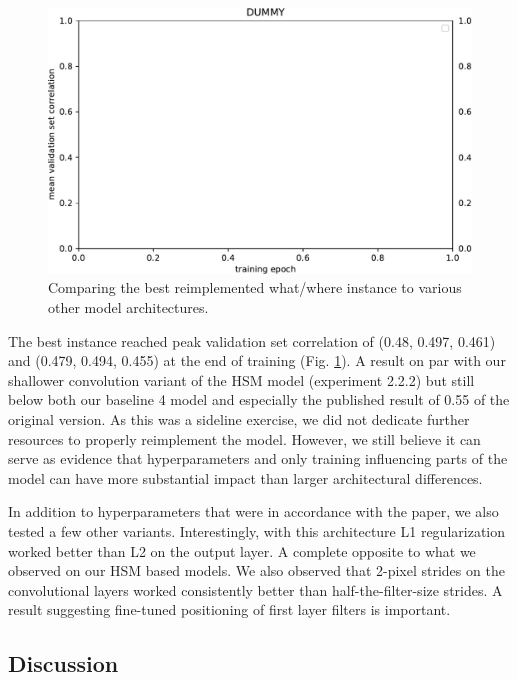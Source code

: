 \begin{figure}[H]
    \centering
    \includegraphics[width=1\textwidth]{../figures/05_dummy}
    \caption[Experiment 5.2.2.5]{Comparing the best reimplemented what/where instance to various other model architectures.}
    \label{fig:5.2.2.5}
\end{figure}

The best instance reached peak validation set correlation of (0.48, 0.497, 0.461) and (0.479, 0.494, 0.455) at the end of training (Fig. \ref{fig:5.2.2.5}). A result on par with our shallower convolution variant of the HSM model (experiment 2.2.2) but still below both our baseline 4 model and especially the published result of 0.55 of the original \citeauthor{klidnt} version. As this was a sideline exercise, we did not dedicate further resources to properly reimplement the model. However, we still believe it can serve as evidence that hyperparameters and only training influencing parts of the model can have more substantial impact than larger architectural differences.

In addition to hyperparameters that were in accordance with the paper, we also tested a few other variants. Interestingly, with this architecture L1 regularization worked better than L2 on the output layer. A complete opposite to what we observed on our HSM based models. We also observed that 2-pixel strides on the convolutional layers worked consistently better than half-the-filter-size strides. A result suggesting fine-tuned positioning of first layer filters is important.

\subsection{Discussion}


